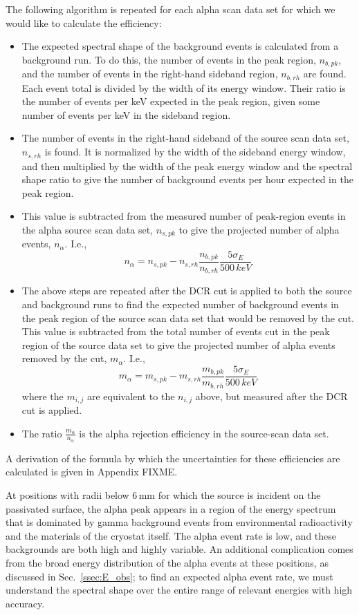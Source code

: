 The following algorithm is repeated for each alpha scan data set for which we would like to calculate the efficiency:
\begin{itemize}
\item The expected spectral shape of the background events is calculated from a background run. To do this, the number of events in the peak region, $n_{b, pk}$, and the number of events in the right-hand sideband region, $n_{b, rh}$ are found. Each event total is divided by the width of its energy window. Their ratio is the number of events per keV expected in the peak region, given some number of events per keV in the sideband region.
\item The number of events in the right-hand sideband of the source scan data set, $n_{s, rh}$ is found. It is normalized by the width of the sideband energy window, and then multiplied by the width of the peak energy window and the spectral shape ratio to give the number of background events per hour expected in the peak region. 
\item This value is subtracted from the measured number of peak-region events in the alpha source scan data set, $n_{s, pk}$ to give the projected number of alpha events, $n_{\alpha}$. I.e., 
$$ n_{\alpha} =  n_{s, pk}-n_{s, rh}\frac{n_{b, pk}}{n_{b, rh}}\frac{5\sigma_E}{500\,keV} $$
\item The above steps are repeated after the DCR cut is applied to both the source and background runs to find the expected number of background events in the peak region of the source scan data set that would be removed by the cut. This value is subtracted from the total number of events cut in the peak region of the source data set to give the projected number of alpha events removed by the cut, $m_\alpha$. I.e.,
 $$ m_{\alpha} =  m_{s, pk}-m_{s, rh}\frac{m_{b, pk}}{m_{b, rh}}\frac{5\sigma_E}{500\,keV} $$
 where the $m_{i, j}$ are equivalent to the $n_{i, j}$ above, but measured after the DCR cut is applied. 
\item The ratio $\frac{m_\alpha}{n_\alpha}$ is the alpha rejection efficiency in the source-scan data set. 
\end{itemize}

A derivation of the formula by which the uncertainties for these efficiencies are calculated is given in Appendix FIXME. 

At positions with radii below 6\,mm for which the source is incident on the passivated surface, the alpha peak appears in a region of the energy spectrum that is dominated by gamma background events from environmental radioactivity and the materials of the cryostat itself. The alpha event rate is low, and these backgrounds are both high and highly variable. An additional complication comes from the broad energy distribution of the alpha events at these positions, as discussed in Sec.~\ref{ssec:E_obs}; to find an expected alpha event rate, we must understand the spectral shape over the entire range of relevant energies with high accuracy. 

